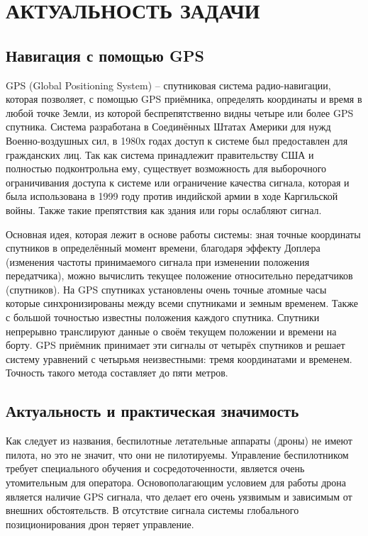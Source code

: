 \chapter{АКТУАЛЬНОСТЬ ЗАДАЧИ}

\section{Навигация с помощью GPS}
GPS (Global Positioning System) -- спутниковая система радио-навигации, которая позволяет, с помощью GPS приёмника, определять координаты и время в любой точке Земли, из которой беспрепятственно видны четыре или более GPS спутника. Система разработана в Соединённых Штатах Америки для нужд  Военно-воздушных сил, в 1980х годах доступ к системе был предоставлен для гражданских лиц. Так как система принадлежит правительству США и полностью подконтрольна ему, существует возможность для выборочного ограничивания доступа к системе или ограничение качества сигнала, которая и была использована в 1999 году против индийской армии в ходе Каргильской войны. Также такие препятствия как здания или горы ослабляют сигнал.

Основная идея, которая лежит в основе работы системы: зная точные координаты спутников в определённый момент времени, благодаря эффекту Доплера (изменения частоты принимаемого сигнала при изменении положения передатчика), можно вычислить текущее положение относительно передатчиков (спутников). На GPS спутниках установлены очень точные атомные часы которые синхронизированы между всеми спутниками и земным временем. Также с большой точностью известны положения каждого спутника. Спутники непрерывно транслируют данные о своём текущем положении и времени на борту. GPS приёмник принимает эти сигналы от четырёх спутников и решает систему уравнений с четырьмя неизвестными: тремя координатами и временем. Точность такого метода составляет до пяти метров.

\section{Актуальность и практическая значимость}

Как следует из названия, беспилотные летательные аппараты (дроны) не имеют пилота, но это не значит, что они не пилотируемы. Управление беспилотником требует специального обучения и сосредоточенности, является очень утомительным для оператора. Основополагающим условием для работы дрона является наличие GPS сигнала, что делает его очень уязвимым и зависимым от внешних обстоятельств. В отсутствие сигнала системы глобального позиционирования дрон теряет управление.

